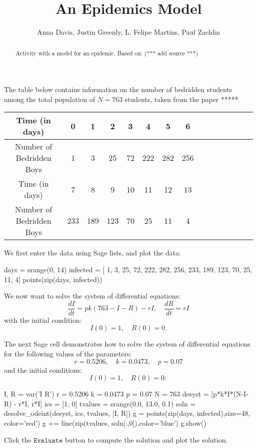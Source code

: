 \documentclass{ximera}
\title{An Epidemics Model}
\author{Anna Davis, Justin Greenly, L. Felipe Martins, Paul Zachlin}
\begin{document}
\begin{abstract}
Activity with a model for an epidemic. Based on: (*** add source ***)
\end{abstract}

\maketitle

The table below contains information on the number of bedridden students among the total population of $N=763$ students, taken from the paper *****

\begin{tabular}{|c|c|c|c|c|c|c|c|c|c|c|c|c|c|c|}\hline
Time (in days)           & 0 & 1 &  2 &  3 &  4 &    5 &   6  \\\hline
Number of Bedridden Boys & 1 & 3 & 25 & 72 & 222 & 282 & 256 \\\hline\hline
Time (in days) &             7 &   8 &   9 & 10 & 11 & 12 & 13\\\hline
Number of Bedridden Boys & 233 & 189 & 123 & 70 & 25 & 11 &  4\\\hline
\end{tabular}

We first enter the data using Sage lists, and plot the data:

\begin{sageCell}
days = srange(0, 14)
infected = [  1,   3,  25, 72, 222, 282, 256, 
            233, 189, 123, 70,  25,  11,   4]
points(zip(days, infected))
\end{sageCell}

We now want to solve the system of differential equations:
\[
\frac{dI}{dt}=pk(763-I-R)-rI,\quad\frac{dR}{dt}=rI
\]
with the initial condition:
\[
I(0)=1,\quad R(0)=0.
\]

The next Sage cell demonstrates how to solve the system of differential equations for the following values of the parameters:
\[
r = 0.5206,\quad k = 0.0473,\quad p = 0.07
\]
and the initial conditions:
\[
I(0)=1,\quad R(0)=0:
\]

\begin{sageCell}
I, R = var('I R')
r = 0.5206
k = 0.0473
p = 0.07
N = 763
desyst = [p*k*I*(N-I-R) - r*I, r*I]
ics = [1, 0]
tvalues = srange(0.0, 13.0, 0.1)
soln = desolve_odeint(desyst, ics, tvalues, [I, R])
g = points(zip(days, infected),size=48, color='red')
g += line(zip(tvalues, soln[:,0]),color='blue')
g.show()\end{sageCell}

Click the $\mathtt{Evaluate}$ button to compute the solution and plot the solution.
\end{document}
